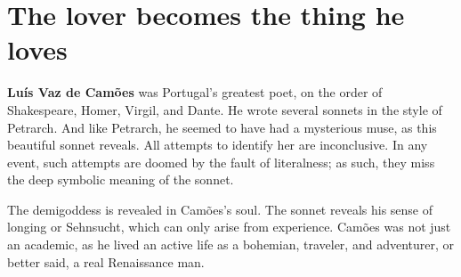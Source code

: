 \section{The lover becomes the thing he loves}

\textbf{Luís Vaz de Camões} was Portugal's greatest poet, on the order of Shakespeare, Homer, Virgil, and Dante. He wrote several sonnets in the style of Petrarch. And like Petrarch, he seemed to have had a mysterious muse, as this beautiful sonnet reveals. All attempts to identify her are inconclusive. In any event, such attempts are doomed by the fault of literalness; as such, they miss the deep symbolic meaning of the sonnet.

The demigoddess is revealed in Camões's soul. The sonnet reveals his sense of longing or Sehnsucht, which can only arise from experience. Camões was not just an academic, as he lived an active life as a bohemian, traveler, and adventurer, or better said, a real Renaissance man.

\newlength{\saveleftmargini}
\setlength{\saveleftmargini}{\leftmargini}
\setlength{\leftmargini}{0em}

